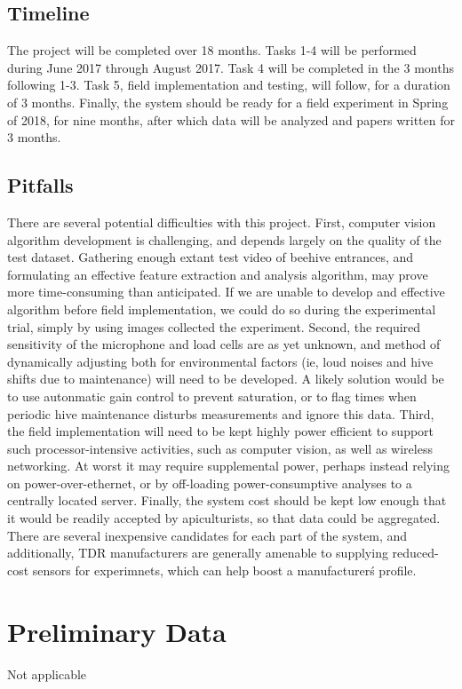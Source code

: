 \subsection{Timeline}

The project will be completed over 18 months. Tasks 1-4 will be performed during June 2017 through August 2017. Task 4 will be completed in the 3 months following 1-3. Task 5, field implementation and testing, will follow, for a duration of 3 months. Finally, the system should be ready for a field experiment in Spring of 2018, for nine months, after which data will be analyzed and papers written for 3 months.

\subsection{Pitfalls}

There are several potential difficulties with this project. First, computer vision algorithm development is challenging, and depends largely on the quality of the test dataset. Gathering enough extant test video of beehive entrances, and formulating an effective feature extraction and analysis algorithm, may prove more time-consuming than anticipated. If we are unable to develop and effective algorithm before field implementation, we could do so during the experimental trial, simply by using images collected the experiment. Second, the required sensitivity of the microphone and load cells are as yet unknown, and method of dynamically adjusting both for environmental factors (ie, loud noises and hive shifts due to maintenance) will need to be developed. A likely solution would be to use autonmatic gain control to prevent saturation, or to flag times when periodic hive maintenance disturbs measurements and ignore this data. Third, the field implementation will need to be kept highly power efficient to support such processor-intensive activities, such as computer vision, as well as wireless networking. At worst it may require  supplemental power, perhaps instead relying on power-over-ethernet, or by off-loading power-consumptive analyses to a centrally located server. Finally, the system cost should be kept low enough that it would be readily accepted by apiculturists, so that data could be aggregated. There are several inexpensive candidates for each part of the system, and additionally, TDR manufacturers are generally amenable to supplying reduced-cost sensors for experimnets, which can help boost a manufacturer\'s profile.

\section{Preliminary Data}

Not applicable

